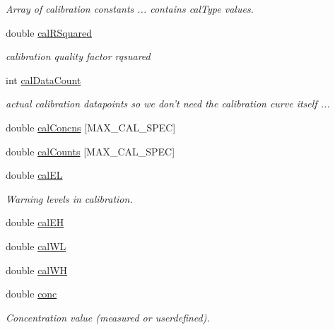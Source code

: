 \begin{DoxyCompactItemize}
\begin{DoxyCompactList}\small\item\em Array of calibration constants ... contains calType values. \item\end{DoxyCompactList}\item 
double \hyperlink{classCSpectrumData_af58a08887d61f47025a58c010e795c88}{calRSquared}
\begin{DoxyCompactList}\small\item\em calibration quality factor rqsuared \item\end{DoxyCompactList}\item 
int \hyperlink{classCSpectrumData_aa3fa478b3ed634cafb00225aafcf136b}{calDataCount}
\begin{DoxyCompactList}\small\item\em actual calibration datapoints so we don't need the calibration curve itself ... \item\end{DoxyCompactList}\item 
double \hyperlink{classCSpectrumData_aa8be4bb61eba1061b182284528d39ab0}{calConcns} \mbox{[}MAX\_\-CAL\_\-SPEC\mbox{]}
\item 
double \hyperlink{classCSpectrumData_a71e009941c48149db24e601dce1aaacc}{calCounts} \mbox{[}MAX\_\-CAL\_\-SPEC\mbox{]}
\item 
double \hyperlink{classCSpectrumData_a2aef98fe50feed756f5dac805fdcf5ef}{calEL}
\begin{DoxyCompactList}\small\item\em Warning levels in calibration. \item\end{DoxyCompactList}\item 
double \hyperlink{classCSpectrumData_a6295b0ee3a35dc4f50a627c51a3da4fe}{calEH}
\item 
double \hyperlink{classCSpectrumData_a3df4b08f19dc399c7258c1f58063f121}{calWL}
\item 
double \hyperlink{classCSpectrumData_a12b1698e9d0e4048270868630abb1036}{calWH}
\item 
double \hyperlink{classCSpectrumData_acc551c43a27ec0448a0b24d53ddc2075}{conc}
\begin{DoxyCompactList}\small\item\em Concentration value (measured or userdefined). \item\end{DoxyCompactList}\item 

\end{DoxyCompactItemize}
